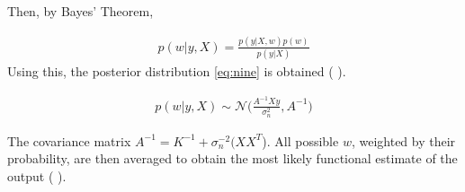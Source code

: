 \documentclass[11pt,a4paper]{article}
\newcommand{\citeboth}[1]{\citeauthor{#1} \citep{#1}}
\begin{document}
Then, by Bayes' Theorem, 

\begin{align}
    p(w|y, X) = \frac{p(y|X,w) p(w)}{p(y|X)} \label{eq: post}
\end{align}
Using this, the posterior distribution \eqref{eq:nine} is obtained (\citeboth{rasmussen2006}).

\begin{align}
    p(w|y, X) \sim \mathcal{N}\bigl(\frac{A^{-1}Xy}{\sigma_{n}^{2}}, A^{-1}\bigr) \label{eq:nine}
\end{align}

The covariance matrix $A^{-1} = K^{-1} + \sigma_{n}^{-2}(XX^T$).
All possible $w$, weighted by their probability, are then averaged to obtain the
most likely functional estimate of the output (\citeboth{rasmussen2006}).



\end{document}
